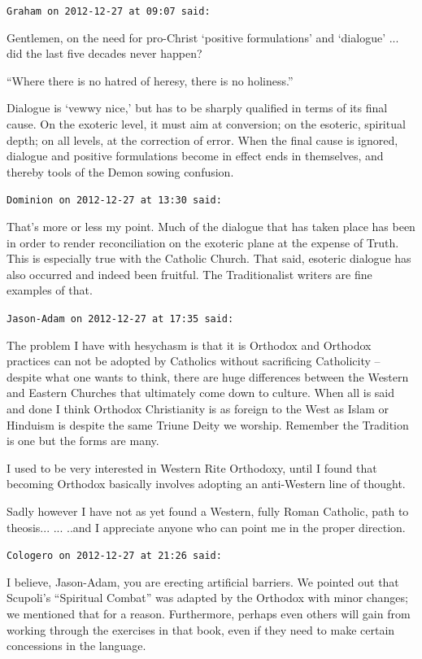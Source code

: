 \begin{footnotesize}
\begin{sffamily}
\hfill

\texttt{Graham on 2012-12-27 at 09:07 said:}

Gentlemen, on the need for pro-Christ `positive formulations' and `dialogue' ... did the last five decades never happen?

``Where there is no hatred of heresy, there is no holiness.''

Dialogue is `vewwy nice,' but has to be sharply qualified in terms of its final cause. On the exoteric level, it must aim at conversion; on the esoteric, spiritual depth; on all levels, at the correction of error. When the final cause is ignored, dialogue and positive formulations become in effect ends in themselves, and thereby tools of the Demon sowing confusion.

\hfill

\texttt{Dominion on 2012-12-27 at 13:30 said:}

That's more or less my point. Much of the dialogue that has taken place has been in order to render reconciliation on the exoteric plane at the expense of Truth. This is especially true with the Catholic Church. That said, esoteric dialogue has also occurred and indeed been fruitful. The Traditionalist writers are fine examples of that.

\hfill

\texttt{Jason-Adam on 2012-12-27 at 17:35 said:}

The problem I have with hesychasm is that it is Orthodox and Orthodox practices can not be adopted by Catholics without sacrificing Catholicity -- despite what one wants to think, there are huge differences between the Western and Eastern Churches that ultimately come down to culture. When all is said and done I think Orthodox Christianity is as foreign to the West as Islam or Hinduism is despite the same Triune Deity we worship. Remember the Tradition is one but the forms are many.

I used to be very interested in Western Rite Orthodoxy, until I found that becoming Orthodox basically involves adopting an anti-Western line of thought.

Sadly however I have not as yet found a Western, fully Roman Catholic, path to theosis... ... ..and I appreciate anyone who can point me in the proper direction.

\hfill

\texttt{Cologero on 2012-12-27 at 21:26 said:}

I believe, Jason-Adam, you are erecting artificial barriers. We pointed out that Scupoli's ``Spiritual Combat'' was adapted by the Orthodox with minor changes; we mentioned that for a reason. Furthermore, perhaps even others will gain from working through the exercises in that book, even if they need to make certain concessions in the language.


\end{sffamily}
\end{footnotesize}
